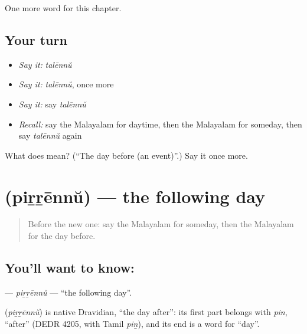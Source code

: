\begin{grammarlens}[title={What you've built}]
One more word for this chapter.
\end{grammarlens}

\subsection*{Your turn}
\begin{itemize}
\raggedright
  \item \emph{Say it:} \emph{talēnnŭ}
  \item \emph{Say it:} \emph{talēnnŭ}, once more
  \item \emph{Say it:} say \emph{talēnnŭ}
  \item \emph{Recall:} say the Malayalam for daytime, then the Malayalam for someday, then say \emph{talēnnŭ} again
\end{itemize}

\begin{tcolorbox}[breakable,colback=teal!4,colframe=teal!35!black,title={Before you move on}]
What does  mean? (\textquotedblleft{}The day before (an event)\textquotedblright{}.) Say it once more.
\end{tcolorbox}
\section[\texorpdfstring{\ml{പിറ്റേന്ന്} (piṟṟēnnŭ)}{പിറ്റേന്ന് (piṟṟēnnŭ)}]{ (piṟṟēnnŭ) — the following day}

\label{lesson:ML-C237-pirrennu}



\begin{quote}
Before the new one: say the Malayalam for someday, then the Malayalam for the day before.
\end{quote}

\subsection*{You'll want to know: }
\textbf{} — \emph{piṟṟēnnŭ} — \textquotedblleft{}the following day\textquotedblright{}.

\begin{cousinweb}
\textbf{} (\emph{piṟṟēnnŭ}) is native Dravidian, \textquotedblleft{}the day after\textquotedblright{}: its first part belongs with \emph{pin}, \textquotedblleft{}after\textquotedblright{} (DEDR 4205, with Tamil \emph{piṉ}), and its end is a word for \textquotedblleft{}day\textquotedblright{}.
\end{cousinweb}

